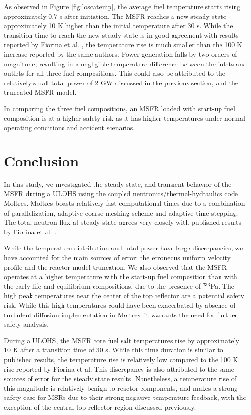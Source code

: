 \documentclass{anstrans}
\begin{document}
	As observed in Figure \ref{fig:loscatemp}, the average fuel temperature
	starts rising approximately 0.7 s after initiation. The \gls{MSFR} reaches
	a new steady state approximately 10 K higher than the initial temperature
	after 30 s. While the transition time to reach the new steady state is in
	good agreement with results reported by
	Fiorina et al. \cite{fiorina_modelling_2014}, the temperature rise is much
	smaller than the 100 K increase reported by the same authors.
	Power generation falls by two orders of
	magnitude, resulting in a negligible temperature difference between the
	inlets and outlets for all three fuel compositions. This could also be
	attributed to the relatively small total power of 2 GW discussed in the
	previous section, and the truncated \gls{MSFR} model.
	
	In comparing the three fuel compositions, an \gls{MSFR} loaded with
	start-up fuel composition is at a higher safety risk as it has higher
	temperatures under normal operating conditions and accident scenarios.

\section{Conclusion}

	In this study, we investigated the steady state, and transient behavior of
	the \gls{MSFR} during a \gls{ULOHS}
	using the coupled neutronics/thermal-hydraulics code Moltres. Moltres
	boasts relatively fast computational times due to a combination of
	parallelization,
	adaptive coarse meshing scheme and adaptive time-stepping. The total
	neutron flux at steady state agrees very closely with published results by
	Fiorina et al. \cite{fiorina_modelling_2014}.
	
	While the temperature
	distribution and total power have
	large discrepancies, we have accounted for the main sources of error:
	the erroneous uniform velocity profile and the reactor model truncation. We
	also observed that the \gls{MSFR} operates at a higher temperature with the
	start-up fuel composition than with the early-life and equilibrium
	compositions, due to the presence of $^{233}$Pa. The high peak temperatures 
	near the center of the top reflector are a potential safety risk. While
	this high temperatures could have been exacerbated by absence of turbulent
	diffusion implementation in Moltres, it warrants the need for further
	safety analysis.
	
	During a \gls{ULOHS}, the \gls{MSFR} core fuel salt temperatures rise by
	approximately 10 K after a transition time of 30 s. While this time
	duration is
	similar to published results, the temperature rise is relatively low
	compared to the 100 K rise reported by Fiorina et al.
	\cite{fiorina_modelling_2014} This discrepancy is also attributed to the
	same sources of error for the steady state results. Nonetheless, a
	temperature rise of
	this magnitude is relatively benign to reactor components, and makes
	a strong safety case for \glspl{MSR} due to their strong negative
	temperature feedback, with the exception of the central top reflector
	region discussed previously.
	
\end{document}
